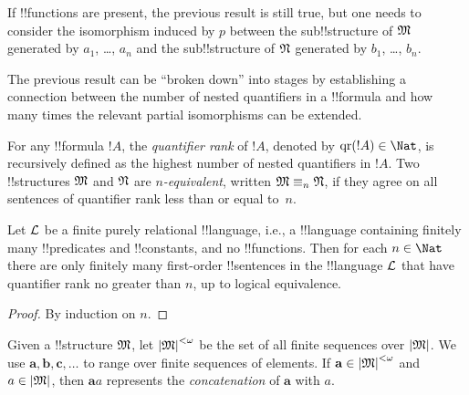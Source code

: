 \documentclass[../../include/open-logic-section]{subfiles}
\begin{document}
\begin{rem}
If !!{function}s are present, the previous result is still true, but
one needs to consider the isomorphism induced by $p$ between the
sub!!{structure} of $\mathfrak M$ generated by $a_1$, \dots, $a_n$ and the
sub!!{structure} of $\mathfrak N$ generated by $b_1$, \dots, $b_n$.
\end{rem}

The previous result can be ``broken down'' into stages by establishing a
connection between the number of nested quantifiers in a !!{formula} and
how many times the relevant partial isomorphisms can be extended.

\begin{defn}
  For any !!{formula} $!A$, the \emph{quantifier rank} of $!A$, denoted
  by $\QuantRank{!A} \in \Nat$, is recursively defined as
  the highest number of nested quantifiers in $!A$.  Two
  !!{structure}s $\mathfrak M$ and $\mathfrak N$ are \emph{$n$-equivalent},
  written $\Struct{M} \elemequiv[n] \Struct{N}$, if they agree on all
  sentences of quantifier rank less than or equal to~$n$.
\end{defn}

\begin{prop}
  Let $\mathcal L$ be a finite purely relational !!{language}, i.e., a
  !!{language} containing finitely many !!{predicate}s and !!{constant}s,
  and no !!{function}s. Then for each $n \in \Nat$ there are
  only finitely many first-order !!{sentence}s in the !!{language}
  $\mathcal L$ that have quantifier rank no greater than $n$, up to
  logical equivalence.
\end{prop}

\begin{proof}
  By induction on $n$.
\end{proof}

\begin{defn}
  Given a !!{structure} $\mathfrak M$, let $\left| \mathfrak M \right|^{<\omega}$ be the set of
  all finite sequences over $\left| \mathfrak M \right|$. We use $\mathbf{a},
  \mathbf{b}, \mathbf{c}, \ldots$ to range over finite sequences of
  elements. If $\mathbf{a} \in \left| \mathfrak M \right|^{<\omega}$ and $a \in \left| \mathfrak M \right|$, then
  $\mathbf{a}a$ represents the \emph{concatenation} of $\mathbf{a}$ with $a$.
\end{defn}
\end{document}
